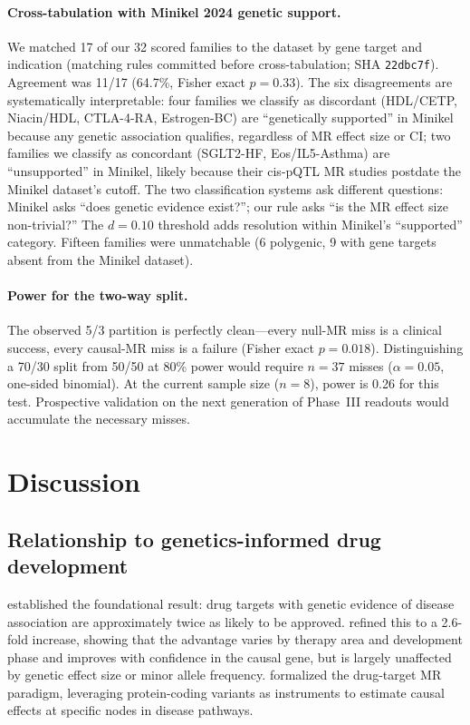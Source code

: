 \documentclass[11pt]{article}
\begin{document}
\paragraph{Cross-tabulation with Minikel 2024 genetic support.} We matched 17 of our 32 scored families to the \citet{minikel2024} dataset by gene target and indication (matching rules committed before cross-tabulation; SHA \texttt{22dbc7f}). Agreement was 11/17 (64.7\%, Fisher exact $p = 0.33$). The six disagreements are systematically interpretable: four families we classify as discordant (HDL/CETP, Niacin/HDL, CTLA-4-RA, Estrogen-BC) are ``genetically supported'' in Minikel because any genetic association qualifies, regardless of MR effect size or CI; two families we classify as concordant (SGLT2-HF, Eos/IL5-Asthma) are ``unsupported'' in Minikel, likely because their cis-pQTL MR studies postdate the Minikel dataset's cutoff. The two classification systems ask different questions: Minikel asks ``does genetic evidence exist?''; our rule asks ``is the MR effect size non-trivial?'' The $d = 0.10$ threshold adds resolution within Minikel's ``supported'' category. Fifteen families were unmatchable (6 polygenic, 9 with gene targets absent from the Minikel dataset).

\paragraph{Power for the two-way split.} The observed 5/3 partition is perfectly clean---every null-MR miss is a clinical success, every causal-MR miss is a failure (Fisher exact $p = 0.018$). Distinguishing a 70/30 split from 50/50 at 80\% power would require $n = 37$ misses ($\alpha = 0.05$, one-sided binomial). At the current sample size ($n = 8$), power is 0.26 for this test. Prospective validation on the next generation of Phase~III readouts would accumulate the necessary misses.

\section{Discussion}

\subsection{Relationship to genetics-informed drug development}

\citet{nelson2015} established the foundational result: drug targets with genetic evidence of disease association are approximately twice as likely to be approved. \citet{minikel2024} refined this to a 2.6-fold increase, showing that the advantage varies by therapy area and development phase and improves with confidence in the causal gene, but is largely unaffected by genetic effect size or minor allele frequency. \citet{gill2021} formalized the drug-target MR paradigm, leveraging protein-coding variants as instruments to estimate causal effects at specific nodes in disease pathways.
\end{document}
